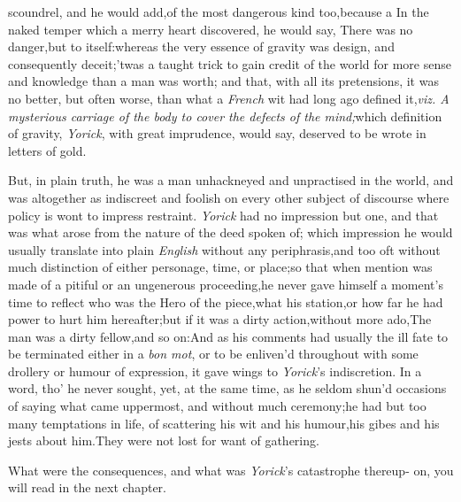 \documentclass{article}
\begin{document}
\noindent
{}
scoundrel, and he would add,\tsk  of the
most dangerous kind too,\tsk  because a\break
{} 
In the naked temper which a merry heart discovered, he would say, There was no
danger,\tsk  but to itself:\tsk  whereas the very essence of gravity was design, and
consequently deceit;\tsk  ’twas a taught trick to gain credit of the world for more
sense and knowledge than a man was worth; and that, with all its pretensions,\tsk
it was no better, but often worse, than what a \textit{French} wit had long ago
defined it,\tsk  \textit{viz. A mysterious carriage of the body to cover the defects
of the mind;}\tsk  which definition of gravity, \textit{Yorick}, with great
imprudence, would say, deserved to be wrote in letters of gold.

But, in plain truth, he was a man unhackneyed and unpractised in
the world, and was altogether as indiscreet and foolish on every
other subject of discourse where policy is wont to impress
restraint. \textit{Yorick} had no impression but one, and that was
what arose from the nature of the deed spoken of; which impression
he would usually translate into plain \textit{English} without any
periphrasis,\tsk  and too oft without much distinction of either
personage, time, or place;\tsk  so that when mention was made of a
pitiful or an ungenerous proceeding,\tsh  he never gave
himself a moment’s time to reflect who was the Hero of the
piece,\tsh  what his station,\tsh  or how far he
had power to hurt him hereafter;\tsk  but if it was a dirty
action,\tsk  without more ado,\tsk  The man was a dirty
fellow,\tsk  and so on:\tsk\break  And as his comments had usually the
ill fate to be terminated either in a \textit{bon mot}, or to be
enliven’d throughout with some drollery or humour of expression, it
gave wings to \textit{Yorick}’s indiscretion. In a word,
tho’ he never sought, yet, at the same time, as he seldom
shun’d occasions of saying what came uppermost, and without much
ceremony;\tsk  he had but too many temptations in life, of
scattering his wit and his humour,\tsk  his gibes and his jests
about him.\tsh  They were not lost for want of
gathering.

What were the consequences, and\break 
what was \textit{Yorick}’s catastrophe thereup-\break
on, you will read in the next chapter.
\end{document}
